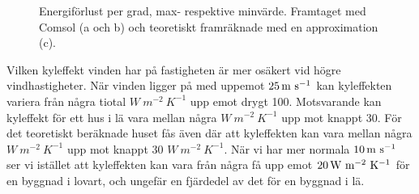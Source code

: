 \begin{figure}[hpbt]
\centering
{}
\vspace{5mm}


\caption{\label{fig:windenergyloss}Energiförlust per grad, max- respektive minvärde.
Framtaget med Comsol (a och b) och teoretiskt framräknade med en approximation (c).}
\end{figure}

Vilken kyleffekt vinden har på fastigheten är mer osäkert vid högre vindhastigheter. När vinden
 ligger på med uppemot $\unit[25]{m~s^{-1}}$ kan kyleffekten variera från några tiotal $\unit{W~m^{-2}~K^{-1}}$ upp 
 emot drygt 100. Motsvarande kan kyleffekt för ett hus i lä vara mellan några $\unit{W~m^{-2}~K^{-1}}$ upp mot knappt 30. För det teoretiskt beräknade huset fås även där att kyleffekten 
 kan vara mellan några $\unit{W~m^{-2}~K^{-1}}$ upp mot knappt 30 $\unit{W~m^{-2}~K^{-1}}$. När vi har mer normala $\unit[10]{m~s^{-1}}$ ser vi istället att kyleffekten kan vara från några få upp emot $\unit[20]{W~m^{-2}~K^{-1}}$ för en byggnad i 
 lovart, och ungefär en fjärdedel av det för en byggnad i lä.
 
